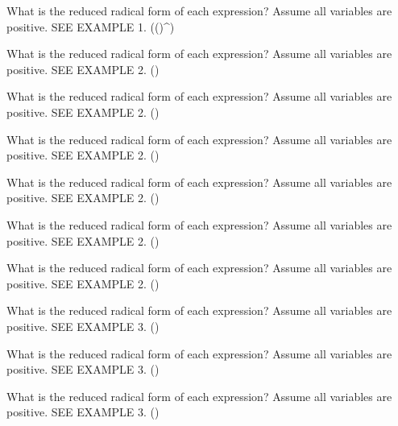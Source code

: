 \documentclass{article}
\newenvironment{practice}[2]{}{}        %
\newcommand{\answer}[1]{}               %
\begin{document}
\begin{practice}{22}{1}
What is the reduced radical form of each expression? Assume all variables are positive. SEE EXAMPLE 1.
(()^{})
\answer{(\frac{4c^7}{9d^9})}
\end{practice}
\begin{practice}{23}{1}
What is the reduced radical form of each expression? Assume all variables are positive. SEE EXAMPLE 2.
()
\answer{(5z\sqrt[3]{2y^2z})}
\end{practice}
\begin{practice}{24}{1}
What is the reduced radical form of each expression? Assume all variables are positive. SEE EXAMPLE 2.
()
\answer{(4vw^3\sqrt[4]{v^3})}
\end{practice}
\begin{practice}{25}{1}
What is the reduced radical form of each expression? Assume all variables are positive. SEE EXAMPLE 2.
()
\answer{(\frac{4x}y)}
\end{practice}
\begin{practice}{26}{1}
What is the reduced radical form of each expression? Assume all variables are positive. SEE EXAMPLE 2.
()
\answer{(2x^2y^2\sqrt2)}
\end{practice}
\begin{practice}{27}{1}
What is the reduced radical form of each expression? Assume all variables are positive. SEE EXAMPLE 2.
()
\answer{(6\sqrt[3]{m})}
\end{practice}
\begin{practice}{28}{1}
What is the reduced radical form of each expression? Assume all variables are positive. SEE EXAMPLE 2.
()
\answer{(5f\sqrt[3]{f^2g^2})}
\end{practice}
\begin{practice}{29}{1}
What is the reduced radical form of each expression? Assume all variables are positive. SEE EXAMPLE 3.
()
\answer{(3x^6y^5\sqrt{2y})}
\end{practice}
\begin{practice}{30}{1}
What is the reduced radical form of each expression? Assume all variables are positive. SEE EXAMPLE 3.
()
\answer{(\frac{\sqrt[3]{6n}}2)}
\end{practice}
\begin{practice}{31}{1}
What is the reduced radical form of each expression? Assume all variables are positive. SEE EXAMPLE 3.
(\cdot{}\cdot{})
\answer{(3x^2\sqrt[3]{x})}
\end{practice}
\end{document}

